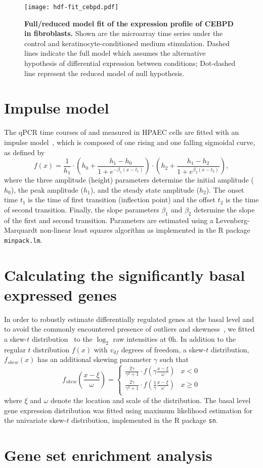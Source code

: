 \begin{figure}[!ht]
\begin{center}
\texttt{[image: hdf-fit\_cebpd.pdf]}
\end{center}
\caption[Full/reduced model fit of gene expression profile]{
{\bf Full/reduced model fit of the expression profile of CEBPD in fibroblasts.}
Shown are the microarray time series under the control and 
keratinocyte-conditioned medium stimulation. Dashed lines indicate the full
model which assumes the alternative hypothesis of differential expression
between conditions; Dot-dashed line represent the reduced model of null 
hypothesis.
}
\label{fig:full_reduced}
\end{figure}

\section{Impulse model}
The qPCR time courses of \tnfa and \sdfonea measured in HPAEC cells are fitted with an impulse model~\cite{Chechik2009}, which is composed of one rising and one falling sigmoidal curve, as defined by
\[
f(x) = \frac{1}{h_1} \cdot \left(h_0+\frac{h_1-h_0}{1+e^{-\beta_1(x-t_1)}}\right) \cdot
\left(h_2+\frac{h_1-h_2}{1+e^{\beta_2(x-t_2)}}\right), 
\]
where the three amplitude (height) parameters determine the initial amplitude 
($h_0$), the peak amplitude
($h_1$), and the steady state amplitude ($h_2$). The onset time $t_1$ is the time of  first transition (inflection point) and the offset $t_2$ is the time of second  transition. Finally, the slope parameters $\beta_1$ and $\beta_2$ determine the slope of the first and second transition. Parameters are estimated using a  Levenberg-Marquardt non-linear least squares  algorithm as implemented in the R package \texttt{minpack.lm}.

\section{Calculating the significantly basal expressed genes}
In order to robustly estimate differentially regulated genes at the basal level and to avoid the commonly encountered 
presence of outliers and skewness~\cite{Marko2011}, we fitted 
a skew-$t$  distribution~\cite{Azzalini2003} to the $\log_2$ raw intensities at 0h. 
In addition to the regular $t$ distribution $f(x)$ with $v_{df}$ degrees of freedom, a skew-$t$ distribution,  $f_{skew}(x)$ has an additional 
skewing parameter $\gamma$ such that  
\[
f_{skew}\left(\frac{x-\xi}{\omega}\right) = 
\begin{cases}
\frac{2\gamma}{\gamma^2+1} \cdot f\left(\gamma\frac{x-\xi}{\omega}\right) & x<0\\
\frac{2\gamma}{\gamma^2+1} \cdot f\left(\frac{1}{\gamma}\frac{x-\xi}{\omega}\right) & x \geqslant 0\\
\end{cases}
\]
where $\xi$  and  $\omega$ denote the location and scale of the distribution.  
The basal level gene expression distribution was fitted using maximum likelihood 
estimation for the 
univariate skew-$t$ distribution, implemented in the R package \texttt{sn}.

\section{Gene set enrichment analysis}
\label{sec:h838_gage_table}


